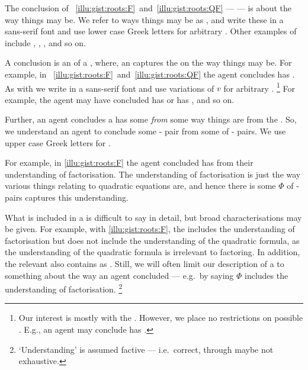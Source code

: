 \begin{note}
  The conclusion of ~\ref{illu:gist:roots:F}~and~\ref{illu:gist:roots:QF} --- \propM{\rootsCon{}} --- is about the way things may be.
  We refer to ways things may be as \emph{}, and write these in a \textsf{sans-serif} font and use lower case Greek letters for arbitrary .
  Other examples of  include , , , and so on.

  A conclusion is an \eval{} of a , where, an \eval{} captures the \agpe{} on the way things may be.
  For example, in ~\ref{illu:gist:roots:F}~and~\ref{illu:gist:roots:QF} the agent concludes \propM{\rootsCon{}} has \emph{} .
  As with  we write  in a \textsf{sans-serif} font and use variations of \(v\) for arbitrary .%
  \footnote{
    Our interest is mostly with the \val{} .
    However, we place no restrictions on possible .
    E.g., an agent may conclude  has \val{} .
  }
  For example, the agent may have concluded \propM{\rootsCon{}} has \val{}  or \propM{\rootsConBad{}} has \val{} , and so on.
\end{note}


\begin{note}
  Further, an agent concludes a  has some  \emph{from} some way things are from the \agpe{}.
  So, we understand an agent to conclude some - pair from some \emph{\pool{}} of \prop{}-\val{} pairs.
  We use upper case Greek letters for .

  For example, in \autoref{illu:gist:roots:F} the agent concluded \propM{\rootsCon{}} has  from their understanding of factorisation.
  The \agents{} understanding of factorisation is just the way various things relating to quadratic equations are, and hence there is some \pool{} \(\Phi\) of - pairs captures this understanding.

  What is included in a \pool{} is difficult to say in detail, but broad characterisations may be given.
  For example, with \autoref{illu:gist:roots:F}, the \pool{} includes the \agents{} understanding of factorisation but does not include the \agents{} understanding of the quadratic formula, as the \agents{} understanding of the quadratic formula is irrelevant to factoring.
  In addition, the relevant \pool{} also contains \rootsConEq{} \evaled{} as .
  Still, we will often limit our description of a \pool{} to something about the way an agent concluded --- e.g.\ by saying \(\Phi\) includes the \agents{} understanding of factorisation.%
  \footnote{
    `Understanding' is assumed factive --- i.e.\ correct, through maybe not exhaustive.
  }
\end{note}


